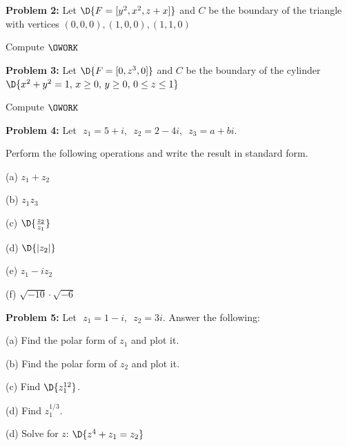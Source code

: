 \documentclass[12pt]{amsart}
\numberwithin{equation}{section}
\begin{document}
{\bf Problem 2:} Let $\D{F = [y^2, x^2, z + x]}$ and $C$ be the boundary of the triangle with vertices
$(0, 0, 0), (1, 0, 0), (1, 1, 0)$

\vspace{0.1cm}

Compute $\OWORK$

\thispagestyle{empty}
\newpage
\thispagestyle{empty}

{\bf Problem 3:} Let $\D{F = [0, z^3, 0]}$ and $C$ be the boundary of the cylinder
$\D{x^2 + y^2 = 1, \, x \ge 0,\, y \ge 0,\,  0 \le z \le 1}$

\vspace{0.1cm}

Compute $\OWORK$

\thispagestyle{empty}
\newpage
\thispagestyle{empty}

{\bf Problem 4:} Let \,\,$z_1 = 5+i$,\,\, $z_2 = 2-4i$,\,\, $z_3 = a+bi$.  

Perform the following operations and write the result in standard form.

\vspace{0.5cm}

(a) \quad $z_1 + z_2$

\vspace{3.5cm}

(b) \quad $z_1 z_3$

\vspace{3.5cm}

(c) \quad $\D{\frac{z_2}{z_1}}$

\vspace{3.5cm}

(d) \quad $\D{|z_2|}$

\vspace{3.5cm}

(e) \quad $z_1 - iz_2$

\vspace{3.5cm}

(f) \quad $\sqrt{-10}\cdot\sqrt{-6}$


\thispagestyle{empty}
\newpage
\thispagestyle{empty}

{\bf Problem 5:} Let \,\,$z_1 = 1-i$,\,\, $z_2 = 3i$. \quad Answer the following:

\vspace{0.2cm}

(a) Find the polar form of $z_1$ and plot it.

\vspace{3.2cm}

(b) Find the polar form of $z_2$ and plot it.

\vspace{4.2cm}

(c) Find $\D{z_1^{12}}$.

\vspace{4.2cm}

(d) Find $z_1^{1/3}$.

\vspace{4.2cm}

(d) Solve for $z$: \quad $\D{z^4+z_1=z_2}$



 
\thispagestyle{empty}
\newpage
\thispagestyle{empty}
\end{document}
